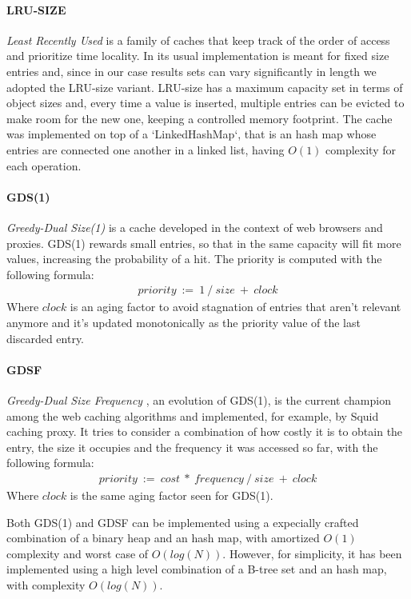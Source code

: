 \paragraph{LRU-SIZE} \emph{Least Recently Used} is a family of caches that keep track of the order of access and prioritize time locality. In its usual implementation is meant for fixed size entries and, since in our case results sets can vary significantly in length we adopted the LRU-size variant. LRU-size has a maximum capacity set in terms of object sizes and, every time a value is inserted, multiple entries can be evicted to make room for the new one, keeping a controlled memory footprint. The cache was implemented on top of a `LinkedHashMap`, that is an hash map whose entries are connected one another in a linked list, having $O(1)$ complexity for each operation.

\paragraph{GDS(1)} \emph{Greedy-Dual Size(1)} \cite{gds1} is a cache developed in the context of web browsers and proxies. GDS(1) rewards small entries, so that in the same capacity will fit more values, increasing the probability of a hit. The priority is computed with the following formula:
\begin{align*}
priority\ :=\ 1\ /\ size\ +\ clock
\end{align*}
Where $clock$ is an aging factor to avoid stagnation of entries that aren't relevant anymore and it's updated monotonically as the priority value of the last discarded entry.

\paragraph{GDSF} \emph{Greedy-Dual Size Frequency} \cite{gdsf}, an evolution of GDS(1), is the current champion among the web caching algorithms and implemented, for example, by Squid caching proxy. It tries to consider a combination of how costly it is to obtain the entry, the size it occupies and the frequency it was accessed so far, with the following formula:
\begin{align*}
priority\ :=\ cost\ *\ frequency\ /\ size\ +\ clock
\end{align*}
Where $clock$ is the same aging factor seen for GDS(1).

Both GDS(1) and GDSF can be implemented using a expecially crafted combination of a binary heap and an hash map, with amortized $O(1)$ complexity and worst case of $O(log(N))$. However, for simplicity, it has been implemented using a high level combination of a B-tree set and an hash map, with complexity $O(log(N))$.
